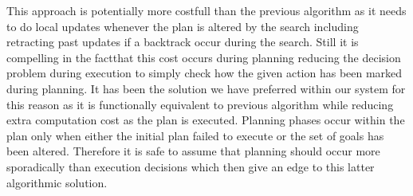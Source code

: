 This approach is potentially more costfull than the previous algorithm 
as it needs to do local updates whenever the plan is altered by the search
including retracting past updates if a backtrack occur during the
search. Still it is compelling in the factthat this cost occurs during
planning reducing the decision problem during execution to simply
check how the given action has been marked during planning. It has
been the solution we have preferred within our system for this reason
as it is functionally equivalent to previous algorithm while reducing
extra computation cost as the plan is executed. Planning phases occur
within the plan only when either the initial plan failed to execute or
the set of goals has been altered. Therefore it is safe to assume that
planning should occur more sporadically than execution decisions 
which then give an edge to this latter algorithmic solution. 

